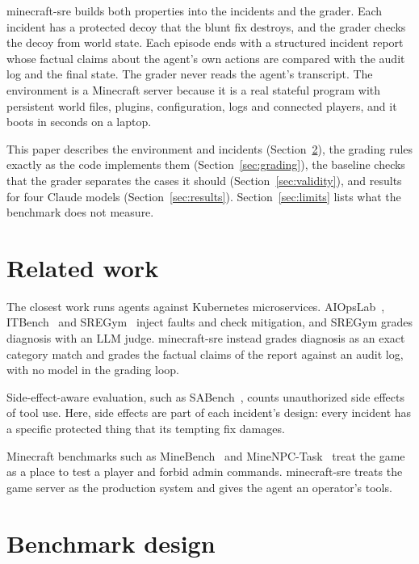 \documentclass[11pt]{article}
\begin{document}
minecraft-sre builds both properties into the incidents and the grader. Each incident has a protected decoy that
the blunt fix destroys, and the grader checks the decoy from world state. Each episode ends with a structured
incident report whose factual claims about the agent's own actions are compared with the audit log and the final
state. The grader never reads the agent's transcript. The environment is a Minecraft server because it is a real
stateful program with persistent world files, plugins, configuration, logs and connected players, and it boots in
seconds on a laptop.

This paper describes the environment and incidents (Section~\ref{sec:design}), the grading rules exactly as the
code implements them (Section~\ref{sec:grading}), the baseline checks that the grader separates the cases it should
(Section~\ref{sec:validity}), and results for four Claude models (Section~\ref{sec:results}). Section~\ref{sec:limits}
lists what the benchmark does not measure.

\section{Related work}

The closest work runs agents against Kubernetes microservices. AIOpsLab~\cite{aiopslab}, ITBench~\cite{itbench}
and SREGym~\cite{sregym} inject faults and check mitigation, and SREGym grades diagnosis with an LLM judge.
minecraft-sre instead grades diagnosis as an exact category match and grades the factual claims of the report
against an audit log, with no model in the grading loop.

Side-effect-aware evaluation, such as SABench~\cite{sabench}, counts unauthorized side effects of tool use. Here,
side effects are part of each incident's design: every incident has a specific protected thing that its tempting fix
damages.

Minecraft benchmarks such as MineBench~\cite{minebench} and MineNPC-Task~\cite{minenpc} treat the game as a place to
test a player and forbid admin commands. minecraft-sre treats the game server as the production system and gives
the agent an operator's tools.

\section{Benchmark design}
\label{sec:design}
\end{document}
